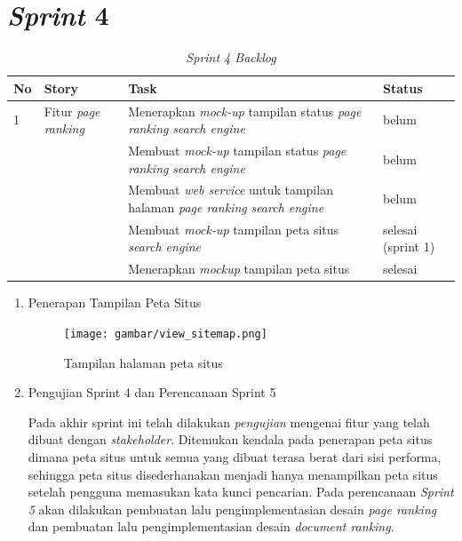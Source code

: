 \section{\textit{Sprint} 4}

\begin{longtable}{@{}|p{0.5cm}|p{4cm}|p{6cm}|p{2cm}|@{}}
	\caption{\textit{Sprint 4 Backlog}}\\	
	\hline
	\textbf{No} & \textbf{Story} & \textbf{Task} & \textbf{Status} \\
	\hline
	1 & Fitur \textit{page ranking} & Menerapkan \textit{mock-up} tampilan status \textit{page ranking} \textit{search engine} & belum \\
	\cline{3-4}
	& & Membuat \textit{mock-up} tampilan status \textit{page ranking} \textit{search engine} & belum \\
	\cline{3-4}
	& & Membuat \textit{web service} untuk tampilan halaman \textit{page ranking} \textit{search engine} & belum \\
	\cline{3-4}
	
	& & Membuat \textit{mock-up} tampilan peta situs \textit{search engine} & selesai (sprint 1) \\
	\cline{3-4}
	& & Menerapkan \textit{mockup} tampilan peta situs & selesai \\
	\cline{1-4}
	
\end{longtable}


\begin{enumerate}[label=\alph*)., leftmargin=1\parindent]
	\item{Penerapan Tampilan Peta Situs}
	
	\begin{figure}[H]
		\centering
		\texttt{[image: gambar/view\_sitemap.png]}
		\caption{Tampilan halaman peta situs}
		\label{gambar:view_sitemap.png}
	\end{figure}		
%
%
%
%
%

	\item{Pengujian Sprint 4 dan Perencanaan Sprint 5} 
	
	Pada akhir sprint ini telah dilakukan \textit{pengujian} mengenai fitur yang telah dibuat dengan \textit{stakeholder}. Ditemukan kendala pada penerapan peta situs dimana peta situs untuk semua yang dibuat terasa berat dari sisi performa, sehingga peta situs disederhanakan menjadi hanya menampilkan peta situs setelah pengguna memasukan kata kunci pencarian. Pada perencanaan \textit{Sprint 5} akan dilakukan pembuatan lalu pengimplementasian desain \textit{page ranking} dan pembuatan lalu pengimplementasian desain \textit{document ranking}.
\end{enumerate}

